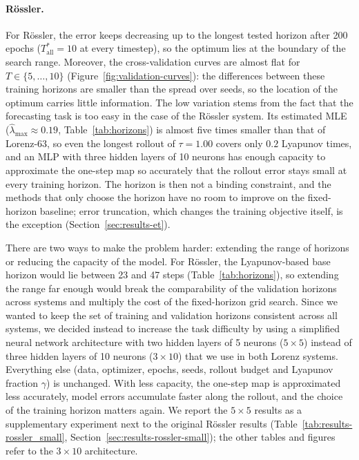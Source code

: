 \documentclass{article}
\begin{document}
\paragraph{Rössler.}
For Rössler, the error keeps decreasing up to the longest tested horizon after 200 epochs ($T^*_{\mathrm{all}} = 10$ at every timestep), so the optimum lies at the boundary of the search range. Moreover, the cross-validation curves are almost flat for $T \in \{5, \dots, 10\}$ (Figure~\ref{fig:validation-curves}): the differences between these training horizons are smaller than the spread over seeds, so the location of the optimum carries little information. The low variation stems from the fact that the forecasting task is too easy in the case of the Rössler system. Its estimated MLE ($\hat\lambda_{\max} \approx 0.19$, Table~\ref{tab:horizons}) is almost five times smaller than that of Lorenz-63, so even the longest rollout of $\tau = 1.00$ covers only $0.2$ Lyapunov times, and an MLP with three hidden layers of 10 neurons has enough capacity to approximate the one-step map so accurately that the rollout error stays small at every training horizon. The horizon is then not a binding constraint, and the methods that only choose the horizon have no room to improve on the fixed-horizon baseline; error truncation, which changes the training objective itself, is the exception (Section~\ref{sec:results-et}).

There are two ways to make the problem harder: extending the range of horizons or reducing the capacity of the model. For Rössler, the Lyapunov-based base horizon would lie between 23 and 47 steps (Table~\ref{tab:horizons}), so extending the range far enough would break the comparability of the validation horizons across systems and multiply the cost of the fixed-horizon grid search. Since we wanted to keep the set of training and validation horizons consistent across all systems, we decided instead to increase the task difficulty by using a simplified neural network architecture with two hidden layers of 5 neurons ($5 \times 5$) instead of three hidden layers of 10 neurons ($3 \times 10$) that we use in both Lorenz systems. Everything else (data, optimizer, epochs, seeds, rollout budget and Lyapunov fraction $\gamma$) is unchanged. With less capacity, the one-step map is approximated less accurately, model errors accumulate faster along the rollout, and the choice of the training horizon matters again. We report the $5 \times 5$ results as a supplementary experiment next to the original Rössler results (Table~\ref{tab:results-rossler_small}, Section~\ref{sec:results-rossler-small}); the other tables and figures refer to the $3 \times 10$ architecture.
\end{document}
